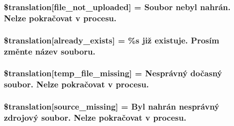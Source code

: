 \subsubsection[{\$translation}]{\setlength{\rightskip}{0pt plus 5cm}\$translation\mbox{[}\textquotesingle{}file\+\_\+not\+\_\+uploaded\textquotesingle{}\mbox{]} = \textquotesingle{}Soubor nebyl nahrán. Nelze pokračovat v procesu.\textquotesingle{}}\label{class_8upload_8cs___c_s_8php_a4ce76e7be0b3a03c2b47f6d70c21832e}
\hypertarget{class_8upload_8cs___c_s_8php_afd84e910217f04139f567c41e292afa5}{}
\subsubsection[{\$translation}]{\setlength{\rightskip}{0pt plus 5cm}\$translation\mbox{[}\textquotesingle{}already\+\_\+exists\textquotesingle{}\mbox{]} = \textquotesingle{}\%s již existuje. Prosím změnte název souboru.\textquotesingle{}}\label{class_8upload_8cs___c_s_8php_afd84e910217f04139f567c41e292afa5}
\hypertarget{class_8upload_8cs___c_s_8php_ab0fa87a88aba2624004581eed0633325}{}
\subsubsection[{\$translation}]{\setlength{\rightskip}{0pt plus 5cm}\$translation\mbox{[}\textquotesingle{}temp\+\_\+file\+\_\+missing\textquotesingle{}\mbox{]} = \textquotesingle{}Nesprávný dočasný soubor. Nelze pokračovat v procesu.\textquotesingle{}}\label{class_8upload_8cs___c_s_8php_ab0fa87a88aba2624004581eed0633325}
\hypertarget{class_8upload_8cs___c_s_8php_aceaaf7355acaaf10f0ae60378d03c468}{}
\subsubsection[{\$translation}]{\setlength{\rightskip}{0pt plus 5cm}\$translation\mbox{[}\textquotesingle{}source\+\_\+missing\textquotesingle{}\mbox{]} = \textquotesingle{}Byl nahrán nesprávný zdrojový soubor. Nelze pokračovat v procesu.\textquotesingle{}}\label{class_8upload_8cs___c_s_8php_aceaaf7355acaaf10f0ae60378d03c468}
\hypertarget{class_8upload_8cs___c_s_8php_aff2427c72a2598aefa6d58df1dd18b08}{}
